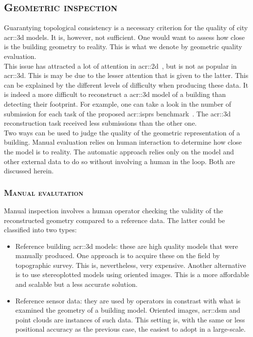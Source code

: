     \subsection{\textsc{Geometric inspection}}
        \label{subsec::introduction::building_model_evaluation::geometric}
        Guarantying topological consistency is a necessary criterion for the quality of city \gls{acr::3d} models.
        It is, however, not sufficient.
        One would want to assess how close is the building geometry to reality.
        This is what we denote by geometric quality evaluation.\\
        This issue has attracted a lot of attention in \gls{acr::2d}~\parencite{mooney2010towards}, but is not as popular in \gls{acr::3d}.
        This is may be due to the lesser attention that is given to the latter.
        This can be explained by the different levels of difficulty when producing these data.
        It is indeed a more difficult to reconstruct a \gls{acr::3d} model of a building than detecting their footprint.
        For example, one can take a look in the number of submission for each task of the proposed \gls{acr::isprs} benchmark~\textcite{rottensteiner2012isprs, rottensteiner2014results}.
        The \gls{acr::3d} reconstruction task received less submissions than the other one.\\
        Two ways can be used to judge the quality of the geometric representation of a building.
        Manual evaluation relies on human interaction to determine how close the model is to reality.
        The automatic approach relies only on the model and other external data to do so without involving a human in the loop.
        Both are discussed herein.

        \subsubsection{\textsc{Manual evalutation}}
            Manual inspection involves a human operator checking the validity of the reconstructed geometry compared to a reference data.
            The latter could be classified into two types:
            \begin{itemize}
                \item Reference building \gls{acr::3d} models: these are high quality models that were manually produced.
                    One approach is to acquire these on the field by topographic survey.
                    This is, nevertheless, very expensive.
                    Another alternative is to use stereoplotted models using oriented images.
                    This is a more affordable and scalable but a less accurate solution.
                \item Reference sensor data: they are used by operators in constrast with what is examined the geometry of a building model.
                    Oriented images, \gls{acr::dsm} and point clouds are instances of such data.
                    This setting is, with the same or less positional accuracy as the previous case, the easiest to adopt in a large-scale.
            \end{itemize}

